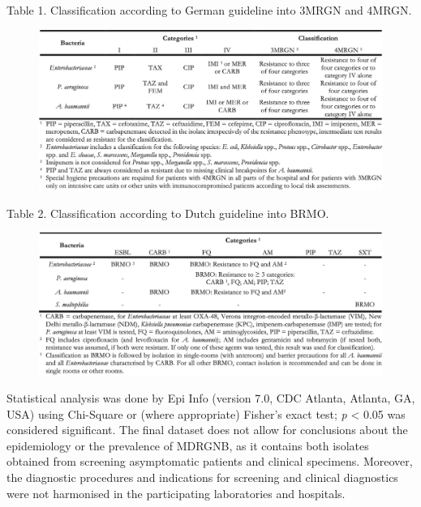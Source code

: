 \documentclass[
]{book}
\begin{document}
Table 1. Classification according to German guideline into 3MRGN and 4MRGN.

\begin{figure}

{\centering \includegraphics[width=1\linewidth]{images/08-t01} 

}

\end{figure}

Table 2. Classification according to Dutch guideline into BRMO.

\begin{figure}

{\centering \includegraphics[width=1\linewidth]{images/08-t02} 

}

\end{figure}

Statistical analysis was done by Epi Info (version 7.0, CDC Atlanta, Atlanta, GA, USA) using Chi-Square or (where appropriate) Fisher's exact test; \emph{p} \textless{} 0.05 was considered significant. The final dataset does not allow for conclusions about the epidemiology or the prevalence of MDRGNB, as it contains both isolates obtained from screening asymptomatic patients and clinical specimens. Moreover, the diagnostic procedures and indications for screening and clinical diagnostics were not harmonised in the participating laboratories and hospitals.
\end{document}
